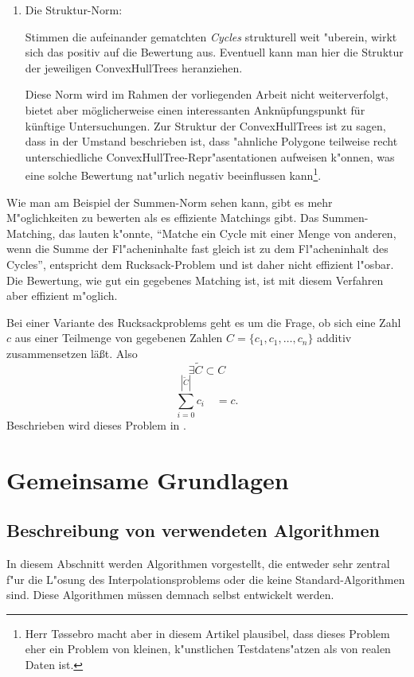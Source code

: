 \begin{enumerate}
\item Die Struktur-Norm:

Stimmen die aufeinander gematchten \textit{Cycles} strukturell weit "uberein, wirkt sich das positiv auf die Bewertung aus. Eventuell kann man hier die Struktur der jeweiligen ConvexHullTrees heranziehen.

Diese Norm wird im Rahmen der vorliegenden Arbeit nicht weiterverfolgt, bietet aber möglicherweise einen interessanten Anknüpfungspunkt für künftige Untersuchungen. Zur Struktur der ConvexHullTrees ist zu sagen, dass in \cite{TG} der Umstand beschrieben ist, dass "ahnliche Polygone teilweise recht unterschiedliche ConvexHullTree-Repr"asentationen aufweisen k"onnen, was eine solche Bewertung nat"urlich negativ beeinflussen kann\footnote{Herr T\o{}ssebro macht aber in diesem Artikel plausibel, dass dieses Problem eher ein Problem von kleinen, k"unstlichen Testdatens"atzen als von realen Daten ist.}.


\end{enumerate} 

Wie man am Beispiel der Summen-Norm sehen kann, gibt es mehr M"oglichkeiten zu bewerten als es effiziente Matchings gibt. Das Summen-Matching, das lauten k"onnte, "`Matche ein Cycle mit  einer Menge von anderen, wenn die Summe der Fl"acheninhalte fast gleich ist zu dem Fl"acheninhalt des Cycles"', entspricht dem Rucksack-Problem und ist daher nicht effizient l"osbar. Die Bewertung, wie gut ein gegebenes Matching ist, ist mit diesem Verfahren aber effizient m"oglich.

Bei einer Variante des Rucksackproblems geht es um die Frage, ob sich eine Zahl $c$ aus einer Teilmenge von gegebenen Zahlen $C=\{c_1,c_1,\hdots,c_n\}$ additiv zusammensetzen läßt. Also 
 $$\exists \tilde{C}\subset C$$ 
$$\sum_{i=0}^{|\tilde{C}|} c_i\quad = c.$$ Beschrieben wird dieses Problem in \cite{Ruck}.

\section{Gemeinsame Grundlagen}

\subsection{Beschreibung von verwendeten Algorithmen} \label{Algorithmen}
In diesem Abschnitt werden Algorithmen vorgestellt, die entweder sehr zentral f"ur die L"osung des Interpolationsproblems oder die keine Standard-Algorithmen sind. Diese Algorithmen müssen demnach selbst entwickelt werden.

